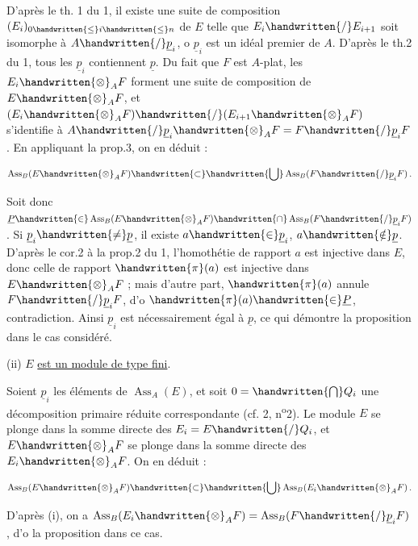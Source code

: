 D'après le th. 1 du \handwritten{\S}{} 1, il existe une suite de composition $(E_i)_{0\handwritten{\leq} i\handwritten{\leq} n}$ de $E$ telle que $E_i\handwritten{/}E_{i+1}$ soit isomorphe à $A\handwritten{/}\underline p_i$, o $\underline p_i$ est un idéal premier de $A$. D'après le th.2 du \handwritten{\S}{} 1, tous les $\underline p_i$ contiennent $\underline p$. Du fait que $F$ est $A$-plat, les $E_i\handwritten{\otimes}_A F$ forment une suite de composition de $E\handwritten{\otimes}_A F$, et $(E_i\handwritten{\otimes}_A F)\handwritten{/}(E_{i+1}\handwritten{\otimes}_A F)$ s'identifie à $A\handwritten{/}\underline p_i\handwritten{\otimes}_A F=F\handwritten{/}\underline p_i F$. En appliquant la prop.3, on en déduit :

\[
\operatorname{Ass}_B(E\handwritten{\otimes}_A F)\handwritten{\subset}\handwritten{\bigcup}\operatorname{Ass}_B(F\handwritten{/}\underline p_i F)\,.
\]

Soit donc $\underline P\handwritten{\in}\operatorname{Ass}_B(E\handwritten{\otimes}_A F)\handwritten{\cap}\operatorname{Ass}_B(F\handwritten{/}\underline p_i F)$. Si $\underline p_i\handwritten{\ne}\underline p$, il existe $a\handwritten{\in}\underline p_i$, $a\handwritten{\notin}\underline p$. D'après le cor.2 à la prop.2 du \handwritten{\S}{} 1, l'homothétie de rapport $a$ est injective dans $E$, donc celle de rapport $\handwritten{\pi}(a)$ est injective dans $E\handwritten{\otimes}_A F$ ; mais d'autre part, $\handwritten{\pi}(a)$ annule $F\handwritten{/}\underline p_i F$, d'o $\handwritten{\pi}(a)\handwritten{\in}\underline P$, contradiction. Ainsi $\underline p_i$ est nécessairement égal à $\underline p$, ce qui démontre la proposition dans le cas considéré.

(ii) $E$ \uline{est un module de type fini}.

Soient $\underline p_i$ les éléments de $\operatorname{Ass}_A(E)$, et soit $0=\handwritten{\bigcap} Q_i$ une décomposition primaire réduite correspondante (cf. \handwritten{\S}{} 2, n\textsuperscript{o}2). Le module $E$ se plonge dans la somme directe des $E_i=E\handwritten{/}Q_i$, et $E\handwritten{\otimes}_A F$ se plonge dans la somme directe des $E_i\handwritten{\otimes}_A F$. On en déduit :

\[
\operatorname{Ass}_B(E\handwritten{\otimes}_A F)\handwritten{\subset}\handwritten{\bigcup}\operatorname{Ass}_B(E_i\handwritten{\otimes}_A F)\,.
\]

D'après (i), on a $\operatorname{Ass}_B(E_i\handwritten{\otimes}_A F)=\operatorname{Ass}_B(F\handwritten{/}\underline p_i F)$, d'o la proposition dans ce cas.

